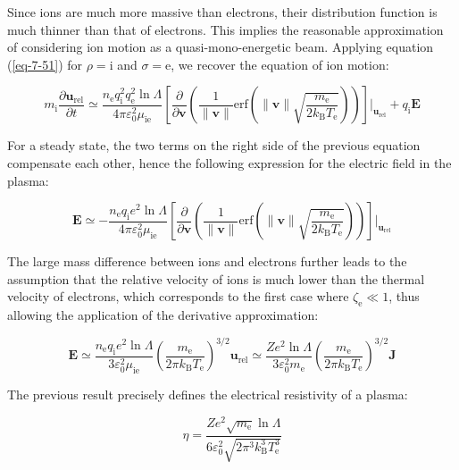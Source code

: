 Since ions are much more massive than electrons, their distribution function is much thinner than that of electrons. This implies the reasonable approximation of considering ion motion as a quasi-mono-energetic beam. Applying equation (\ref{eq-7-51}) for $\rho=\mathrm{i}$ and $\sigma=\text{e}$, we recover the equation of ion motion:

\begin{equation}
    \label{eq-7-63}
    m_\mathrm{i}\frac{\partial\mathbf{u}_\text{rel}}{\partial t}\simeq\frac{n_\text{e}q_\mathrm{i}^2q_\text{e}^2\ln{\Lambda}}{4\pi\varepsilon_0^2\mu_{\text{ie}}}\left[\frac{\partial}{\partial\mathbf{v}}\left(\frac{1}{\|\mathbf{v}\|}\mathrm{erf}\left(\|\mathbf{v}\|\sqrt{\frac{m_\text{e}}{2k_\mathrm{B}T_\text{e}}}\right)\right)\right]\Biggr|_{\mathbf{u}_\text{rel}}+q_\mathrm{i}\mathbf{E}
\end{equation}

For a steady state, the two terms on the right side of the previous equation compensate each other, hence the following expression for the electric field in the plasma:

\begin{equation*}
    \mathbf{E}\simeq-\frac{n_\text{e}q_\mathrm{i}e^2\ln{\Lambda}}{4\pi\varepsilon_0^2\mu_\text{ie}}\left[\frac{\partial}{\partial\mathbf{v}}\left(\frac{1}{\|\mathbf{v}\|}\mathrm{erf}\left(\|\mathbf{v}\|\sqrt{\frac{m_\text{e}}{2k_\mathrm{B}T_\text{e}}}\right)\right)\right]\Biggr|_{\mathbf{u}_\text{rel}}
\end{equation*}

The large mass difference between ions and electrons further leads to the assumption that the relative velocity of ions is much lower than the thermal velocity of electrons, which corresponds to the first case where $\zeta_\text{e}\ll1$, thus allowing the application of the derivative approximation:

\begin{equation}
    \mathbf{E}\simeq\frac{n_\text{e}q_\mathrm{i}e^2\ln{\Lambda}}{3\varepsilon_0^2\mu_\text{ie}}\left(\frac{m_\text{e}}{2\pi k_\mathrm{B}T_\text{e}}\right)^{3/2}\mathbf{u}_\text{rel}\simeq\frac{Ze^2\ln{\Lambda}}{3\varepsilon_0^2 m_\text{e}}\left(\frac{m_\text{e}}{2\pi k_\mathrm{B}T_\text{e}}\right)^{3/2}\mathbf{J}
\end{equation}

The previous result precisely defines the electrical resistivity of a plasma:

\begin{equation}
    \eta=\frac{Ze^2\sqrt{m_\text{e}}\ln{\Lambda}}{6\varepsilon_0^2\sqrt{2\pi^3k_\mathrm{B}^3T_\text{e}^3}}
\end{equation}

